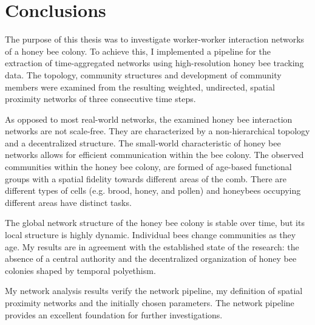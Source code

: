 \chapter{Conclusions}
\label{ch:conclusion}

The purpose of this thesis was to investigate worker-worker interaction networks of a honey bee colony.
To achieve this, I implemented a pipeline for the extraction of time-aggregated networks using high-resolution honey bee tracking data.
The topology, community structures and development of community members were examined from the resulting weighted, undirected, spatial proximity networks of three consecutive time steps.

As opposed to most real-world networks, the examined honey bee interaction networks are not scale-free.
They are characterized by a non-hierarchical topology and a decentralized structure.
The small-world characteristic of honey bee networks allows for efficient communication within the bee colony.
The observed communities within the honey bee colony, are formed of age-based functional groups with a spatial fidelity towards different areas of the comb.
There are different types of cells (e.g. brood, honey, and pollen) and honeybees occupying different areas have distinct tasks.

The global network structure of the honey bee colony is stable over time, but its local structure is highly dynamic.
Individual bees change communities as they age.
My results are in agreement with the established state of the research: the absence of a central authority and the decentralized organization of honey bee colonies shaped by temporal polyethism.

My network analysis results verify the network pipeline, my definition of spatial proximity networks and the initially chosen parameters.
The network pipeline provides an excellent foundation for further investigations.

